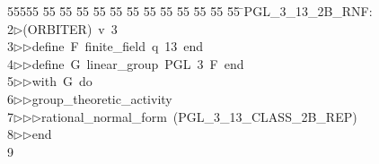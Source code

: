 %
%
\begin{tabbing}
55555 \= 55 \= 55 \= 55 \= 55 \= 55 \= 55 \= 55 \= 55 \= 55 \= 55 \= 55 \= 55 \= \>PGL\_3\_13\_2B\_RNF:\\[0pt]
2\>$\triangleright$\>(ORBITER)\ v\ 3\ \\[0pt]
3\>$\triangleright$\>$\triangleright$\>define\ F\ finite\_field\ q\ 13\ end\ \\[0pt]
4\>$\triangleright$\>$\triangleright$\>define\ G\ linear\_group\ PGL\ 3\ F\ end\ \\[0pt]
5\>$\triangleright$\>$\triangleright$\>with\ G\ do\ \\[0pt]
6\>$\triangleright$\>$\triangleright$\>group\_theoretic\_activity\ \\[0pt]
7\>$\triangleright$\>$\triangleright$\>$\triangleright$\>rational\_normal\_form\ (PGL\_3\_13\_CLASS\_2B\_REP)\ \\[0pt]
8\>$\triangleright$\>$\triangleright$\>end\\[0pt]
9\>\end{tabbing}
